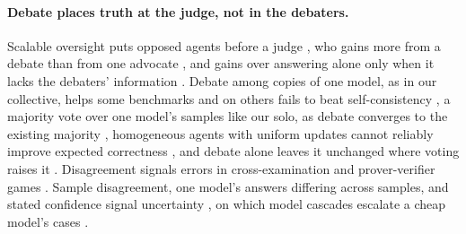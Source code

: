 \paragraph{Debate places truth at the judge, not in the debaters.}
Scalable oversight puts opposed agents before a judge \citep{irving18}, who gains more from a debate than from one advocate
\citep{michael2023debate,khan2024debating}, and gains over answering alone only
when it lacks the debaters' information \citep{kenton2024scalable}.
Debate among copies of one model, as in our collective, helps some
benchmarks \citep{du23,liang2024divergent,chan2023chateval} and on others
\citep{smit2024mad,wang2024rethinking} fails to beat self-consistency
\citep{wang2023selfconsistency}, a majority vote over one model's samples like
our solo, as debate converges to the existing
majority \citep{estornell2024multillm}, homogeneous
agents with uniform updates cannot reliably improve expected correctness
\citep{zhu2026demystifying}, and debate alone leaves it unchanged where voting
raises it \citep{choi2025debateorvote}.
Disagreement signals errors in cross-examination
\citep{cohen2023lmvslm} and prover-verifier games \citep{kirchner2024prover}.
Sample disagreement, one model's answers differing across samples, and stated
confidence signal uncertainty
\citep{manakul2023selfcheck,farquhar2024semantic,xiong2024confidence}, on
which model cascades escalate a cheap model's cases
\citep{chen2023frugal,jitkrittum2023deferral,gupta2024cascades,yue2024cascades,aggarwal2024automix,jung2025escalate,wang2026defer}.
